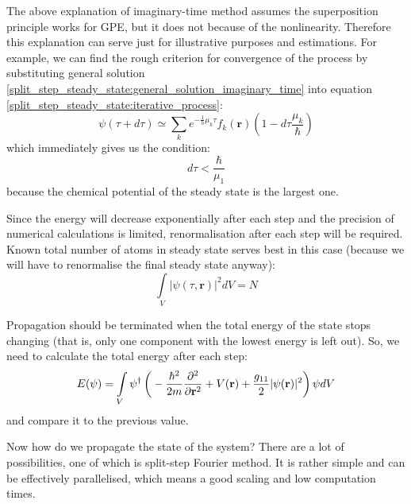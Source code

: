 \documentclass[12pt,notitlepage]{report}
\begin{document}
The above explanation of imaginary-time method assumes the superposition principle works for GPE, but it does not
because of the nonlinearity. Therefore this explanation can serve just for illustrative purposes and estimations.
For example, we can find the rough criterion for convergence of the process by substituting general solution
\ref{split_step_steady_state:general_solution_imaginary_time} into equation
\ref{split_step_steady_state:iterative_process}:
\[ \psi(\tau + d\tau) \simeq \sum_k e^{-\frac{1}{h} \mu_k \tau} f_k(\mathbf{r}) \left( 1 - d\tau \frac{\mu_k}{\hbar} \right) \]
which immediately gives us the condition:
\[ d\tau < \frac{\hbar}{\mu_1} \]
because the chemical potential of the steady state is the largest one.

Since the energy will decrease exponentially after each step and the precision of numerical calculations is limited,
renormalisation after each step will be required. Known total number of atoms in steady
state serves best in this case (because we will have to renormalise the final steady state anyway):
\[ \int\limits_V \vert \psi(\tau, \mathbf{r}) \vert^2 dV = N \]

Propagation should be terminated when the total energy of the state stops changing (that is, only one component
with the lowest energy is left out). So, we need to calculate the total energy after each step:
\[ E(\psi) = \int\limits_V \psi^\dagger \left( \\
-\frac{\hbar^2}{2m} \frac{\partial^2}{\partial \mathbf{r}^2} + V(\mathbf{r}) + \\
\frac{g_{11}}{2} \vert \psi(\mathbf{r}) \vert^2 \right) \psi dV \]
and compare it to the previous value.

Now how do we propagate the state of the system? There are a lot of possibilities, one of which is split-step
Fourier method. It is rather simple and can be effectively parallelised, which means a good scaling and 
low computation times. 
\end{document}
